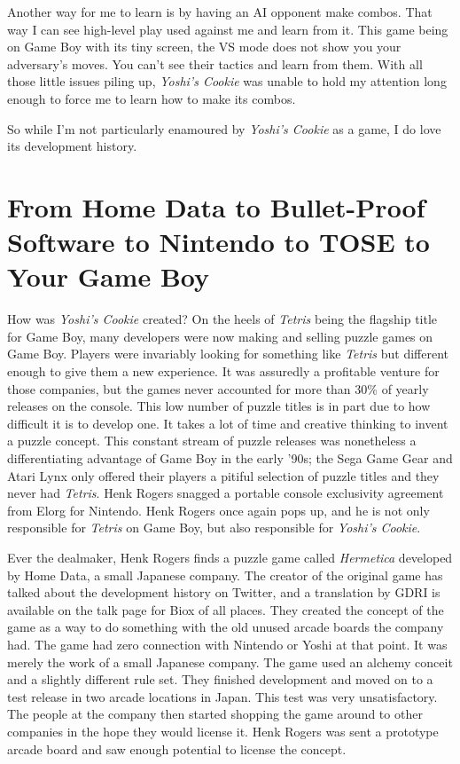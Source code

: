 \documentclass{book}
\begin{document}
Another way for me to learn is by having an AI opponent make combos. That way I can see high-level play used against me and learn from it. This game being on Game Boy with its tiny screen, the VS mode does not show you your adversary’s moves. You can’t see their tactics and learn from them. With all those little issues piling up, \emph{Yoshi’s Cookie} was unable to hold my attention long enough to force me to learn how to make its combos.

So while I’m not particularly enamoured by \emph{Yoshi’s Cookie} as a game, I do love its development history.

\FloatBarrier\needspace{10mm}\section*{From Home Data to Bullet-Proof Software to Nintendo to TOSE to Your Game Boy}\nopagebreak[4]

How was \emph{Yoshi’s Cookie} created? On the heels of \emph{Tetris} being the flagship title for Game Boy, many developers were now making and selling puzzle games on Game Boy. Players were invariably looking for something like \emph{Tetris} but different enough to give them a new experience. It was assuredly a profitable venture for those companies, but the games never accounted for more than 30\% of yearly releases on the console. This low number of puzzle titles is in part due to how difficult it is to develop one. It takes a lot of time and creative thinking to invent a puzzle concept. This constant stream of puzzle releases was nonetheless a differentiating advantage of Game Boy in the early ’90s; the Sega Game Gear and Atari Lynx only offered their players a pitiful selection of puzzle titles and they never had \emph{Tetris}. Henk Rogers snagged a portable console exclusivity agreement from Elorg for Nintendo. Henk Rogers once again pops up, and he is not only responsible for \emph{Tetris} on Game Boy, but also responsible for \emph{Yoshi’s Cookie}.

Ever the dealmaker, Henk Rogers finds a puzzle game called \emph{Hermetica} developed by Home Data, a small Japanese company. The creator of the original game has talked about the development history on Twitter, and a translation by GDRI is available on the talk page for Biox of all places. They created the concept of the game as a way to do something with the old unused arcade boards the company had. The game had zero connection with Nintendo or Yoshi at that point. It was merely the work of a small Japanese company. The game used an alchemy conceit and a slightly different rule set. They finished development and moved on to a test release in two arcade locations in Japan. This test was very unsatisfactory. The people at the company then started shopping the game around to other companies in the hope they would license it. Henk Rogers was sent a prototype arcade board and saw enough potential to license the concept.
\end{document}
